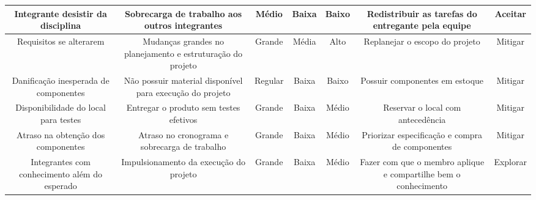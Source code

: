 \begin{table}[]
{\begin{tabular}{|c|c|c|c|c|c|c|}
    Integrante desistir da disciplina                   & Sobrecarga de trabalho aos outros integrantes                              & Médio            & Baixa                  & Baixo                & Redistribuir as tarefas do entregante pela equipe                                                                                                    & Aceitar             \\ \hline
    Requisitos se alterarem                             & Mudanças grandes no planejamento e estruturação do projeto                 & Grande           & Média                  & Alto                 & Replanejar o escopo do projeto                                                                                                                       & Mitigar             \\ \hline
    Danificação inesperada de componentes               & Não possuir material disponível para execução do projeto                   & Regular          & Baixa                  & Baixo                & Possuir componentes em estoque                                                                                                                       & Mitigar             \\ \hline
    Disponibilidade do local para testes                & Entregar o produto sem testes efetivos                                     & Grande           & Baixa                  & Médio                & Reservar o local com antecedência                                                                                                                    & Mitigar             \\ \hline
    Atraso na obtenção dos componentes                  & Atraso no cronograma e sobrecarga de trabalho                              & Grande           & Baixa                  & Médio                & Priorizar especificação e compra de componentes                                                                                                      & Mitigar             \\ \hline
    Integrantes com conhecimento além do esperado       & Impulsionamento da execução do projeto                                     & Grande           & Baixa                  & Médio                & Fazer com que o membro aplique e compartilhe bem o conhecimento                                                                                      & Explorar            \\ \hline
    \end{tabular}%
    }
  \end{table}
